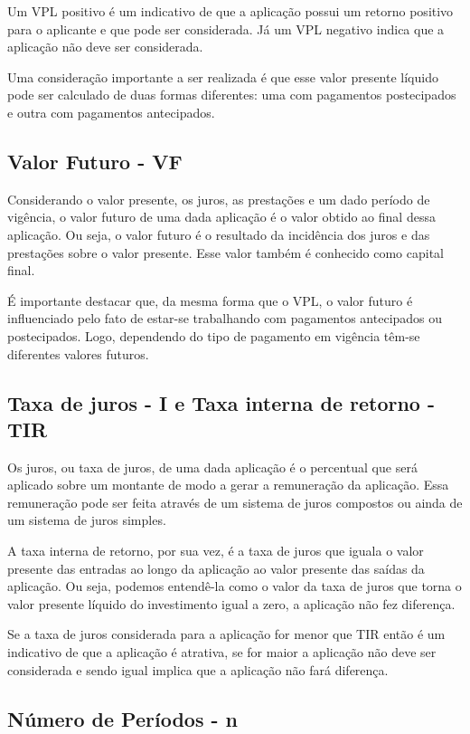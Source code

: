 Um VPL positivo é um indicativo de que a aplicação possui um retorno positivo para o aplicante e que pode ser considerada. Já um VPL negativo indica que a aplicação não deve ser considerada. \cite{vpl}

Uma consideração importante a ser realizada é que esse valor presente líquido pode ser calculado de duas formas diferentes: uma com pagamentos postecipados e outra com pagamentos antecipados.

\subsection{Valor Futuro - VF}

Considerando o valor presente, os juros, as prestações e um dado período de vigência, o valor futuro de uma dada aplicação é o valor obtido ao final dessa aplicação. Ou seja, o valor futuro é o resultado da incidência dos juros e das prestações sobre o valor presente. Esse valor também é conhecido como capital final.

É importante destacar que, da mesma forma que o VPL, o valor futuro é influenciado pelo fato de estar-se trabalhando com pagamentos antecipados ou postecipados. Logo, dependendo do tipo de pagamento em vigência têm-se diferentes valores futuros.

\subsection{Taxa de juros - I e Taxa interna de retorno - TIR}

Os juros, ou taxa de juros, de uma dada aplicação é o percentual que será aplicado sobre um montante de modo a gerar a remuneração da aplicação. Essa remuneração pode ser feita através de um sistema de juros compostos ou ainda de um sistema de juros simples.

A taxa interna de retorno, por sua vez, é a taxa de juros que iguala o valor presente das entradas ao longo da aplicação ao valor presente das saídas da aplicação. Ou seja, podemos entendê-la como o valor da taxa de juros que torna o valor presente líquido do investimento igual a zero, a aplicação não fez diferença.

Se a taxa de juros considerada para a aplicação for menor que TIR então é um indicativo de que a aplicação é atrativa, se for maior a aplicação não deve ser considerada e sendo igual implica que a aplicação não fará diferença. \cite{irr}

\subsection{Número de Períodos - n}

